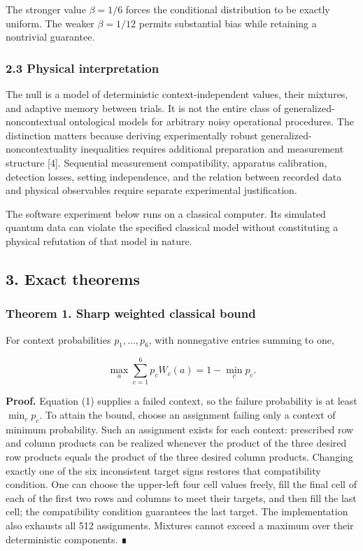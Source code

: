 \documentclass[10pt,a4paper]{article}
\begin{document}
The stronger value \(\beta=1/6\) forces the conditional distribution to
be exactly uniform. The weaker \(\beta=1/12\) permits substantial bias
while retaining a nontrivial guarantee.

\subsubsection{2.3 Physical
interpretation}\label{physical-interpretation}

The null is a model of deterministic context-independent values, their
mixtures, and adaptive memory between trials. It is not the entire class
of generalized-noncontextual ontological models for arbitrary noisy
operational procedures. The distinction matters because deriving
experimentally robust generalized-noncontextuality inequalities requires
additional preparation and measurement structure {[}4{]}. Sequential
measurement compatibility, apparatus calibration, detection losses,
setting independence, and the relation between recorded data and
physical observables require separate experimental justification.

The software experiment below runs on a classical computer. Its
simulated quantum data can violate the specified classical model without
constituting a physical refutation of that model in nature.

\subsection{3. Exact theorems}\label{exact-theorems}

\subsubsection{Theorem 1. Sharp weighted classical
bound}\label{theorem-1.-sharp-weighted-classical-bound}

For context probabilities \(p_1,\ldots,p_6\), with nonnegative entries
summing to one,

\[
\max_a\sum_{c=1}^{6}p_cW_c(a)=1-\min_c p_c. \tag{3}
\]

\textbf{Proof.} Equation (1) supplies a failed context, so the failure
probability is at least \(\min_c p_c\). To attain the bound, choose an
assignment failing only a context of minimum probability. Such an
assignment exists for each context: prescribed row and column products
can be realized whenever the product of the three desired row products
equals the product of the three desired column products. Changing
exactly one of the six inconsistent target signs restores that
compatibility condition. One can choose the upper-left four cell values
freely, fill the final cell of each of the first two rows and columns to
meet their targets, and then fill the last cell; the compatibility
condition guarantees the last target. The implementation also exhausts
all 512 assignments. Mixtures cannot exceed a maximum over their
deterministic components. ∎
\end{document}
